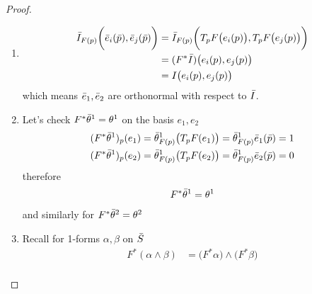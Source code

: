 \documentclass[10pt]{article}
\begin{document}
            \begin{proof}
                \begin{enumerate}
                    \item 
                    \begin{equation*}
                        \begin{aligned}
                            \Bar{I}_{F(p)}\bigg(\Bar{e}_i(\Bar{p}), \Bar{e}_j(\Bar{p})\bigg) &= \Bar{I}_{F(p)}\bigg(T_pF\big(e_i(p)\big), T_pF\big(e_j(p)\big)\bigg) \\ 
                            &= (F^*\Bar{I})\big(e_i(p),e_j(p)\big) \\ 
                            &= I\big(e_i(p),e_j(p)\big)
                        \end{aligned}
                    \end{equation*}
                    which means $\Bar{e}_1, \Bar{e}_2$ are orthonormal with respect to $\Bar{I}$.
                    \item Let's check $F^*\Bar{\theta}^1 = \theta^1$ on the basis $e_1,e_2$
                    \begin{equation*}
                        \begin{aligned}
                            (F^*\Bar{\theta}^1)_p(e_1) = \Bar{\theta}_{F(p)}^1\big(T_pF(e_1)\big) = \Bar{\theta}_{F(p)}^1\Bar{e}_1(\Bar{p}) = 1 \\
                            (F^*\Bar{\theta}^1)_p(e_2) = \Bar{\theta}_{F(p)}^1\big(T_pF(e_2)\big) = \Bar{\theta}_{F(p)}^1\Bar{e}_2(\Bar{p}) = 0
                        \end{aligned}
                    \end{equation*}
                    therefore
                    \begin{equation*}
                        \begin{aligned}
                            F^*\Bar{\theta}^1 = \theta^1
                        \end{aligned}
                    \end{equation*}
                    and similarly for $F^*\Bar{\theta}^2 = \theta^2$
                    \item Recall for 1-forms $\alpha,\beta$ on $\Bar{S}$
                    \begin{equation*}
                        \begin{aligned}
                            F^*(\alpha\wedge\beta) &= \big(F^*\alpha\big)\wedge\big(F^*\beta\big) \\

\end{aligned}
\end{equation*}
\end{enumerate}
\end{proof}
\end{document}
